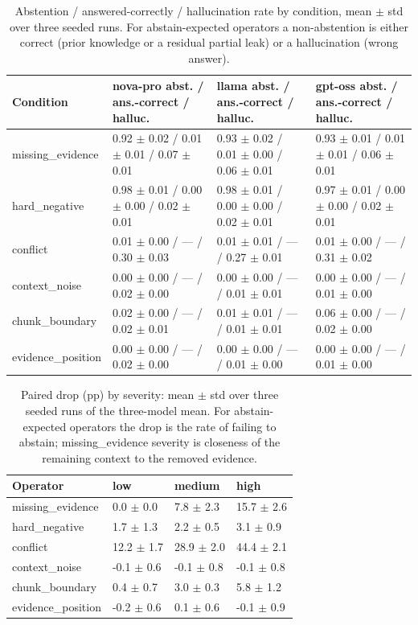 \begin{table}[t]
\centering
\caption{Abstention / answered-correctly / hallucination rate by condition, mean $\pm$ std over three seeded runs. For abstain-expected operators a non-abstention is either correct (prior knowledge or a residual partial leak) or a hallucination (wrong answer).}
\small
\begin{tabular}{llll}
\toprule
Condition & nova-pro abst. / ans.-correct / halluc. & llama abst. / ans.-correct / halluc. & gpt-oss abst. / ans.-correct / halluc. \\
\midrule
missing\_evidence & 0.92 $\pm$ 0.02 / 0.01 $\pm$ 0.01 / 0.07 $\pm$ 0.01 & 0.93 $\pm$ 0.02 / 0.01 $\pm$ 0.00 / 0.06 $\pm$ 0.01 & 0.93 $\pm$ 0.01 / 0.01 $\pm$ 0.01 / 0.06 $\pm$ 0.01 \\
hard\_negative & 0.98 $\pm$ 0.01 / 0.00 $\pm$ 0.00 / 0.02 $\pm$ 0.01 & 0.98 $\pm$ 0.01 / 0.00 $\pm$ 0.00 / 0.02 $\pm$ 0.01 & 0.97 $\pm$ 0.01 / 0.00 $\pm$ 0.00 / 0.02 $\pm$ 0.01 \\
conflict & 0.01 $\pm$ 0.00 / --- / 0.30 $\pm$ 0.03 & 0.01 $\pm$ 0.01 / --- / 0.27 $\pm$ 0.01 & 0.01 $\pm$ 0.00 / --- / 0.31 $\pm$ 0.02 \\
context\_noise & 0.00 $\pm$ 0.00 / --- / 0.02 $\pm$ 0.00 & 0.00 $\pm$ 0.00 / --- / 0.01 $\pm$ 0.01 & 0.00 $\pm$ 0.00 / --- / 0.01 $\pm$ 0.00 \\
chunk\_boundary & 0.02 $\pm$ 0.00 / --- / 0.02 $\pm$ 0.01 & 0.01 $\pm$ 0.01 / --- / 0.01 $\pm$ 0.01 & 0.06 $\pm$ 0.00 / --- / 0.02 $\pm$ 0.00 \\
evidence\_position & 0.00 $\pm$ 0.00 / --- / 0.02 $\pm$ 0.00 & 0.00 $\pm$ 0.00 / --- / 0.01 $\pm$ 0.00 & 0.00 $\pm$ 0.00 / --- / 0.01 $\pm$ 0.00 \\
\bottomrule
\end{tabular}
\end{table}

\begin{table}[t]
\centering
\caption{Paired drop (pp) by severity: mean $\pm$ std over three seeded runs of the three-model mean. For abstain-expected operators the drop is the rate of failing to abstain; missing\_evidence severity is closeness of the remaining context to the removed evidence.}
\small
\begin{tabular}{llll}
\toprule
Operator & low & medium & high \\
\midrule
missing\_evidence & 0.0 $\pm$ 0.0 & 7.8 $\pm$ 2.3 & 15.7 $\pm$ 2.6 \\
hard\_negative & 1.7 $\pm$ 1.3 & 2.2 $\pm$ 0.5 & 3.1 $\pm$ 0.9 \\
conflict & 12.2 $\pm$ 1.7 & 28.9 $\pm$ 2.0 & 44.4 $\pm$ 2.1 \\
context\_noise & -0.1 $\pm$ 0.6 & -0.1 $\pm$ 0.8 & -0.1 $\pm$ 0.8 \\
chunk\_boundary & 0.4 $\pm$ 0.7 & 3.0 $\pm$ 0.3 & 5.8 $\pm$ 1.2 \\
evidence\_position & -0.2 $\pm$ 0.6 & 0.1 $\pm$ 0.6 & -0.1 $\pm$ 0.9 \\
\bottomrule
\end{tabular}
\end{table}

